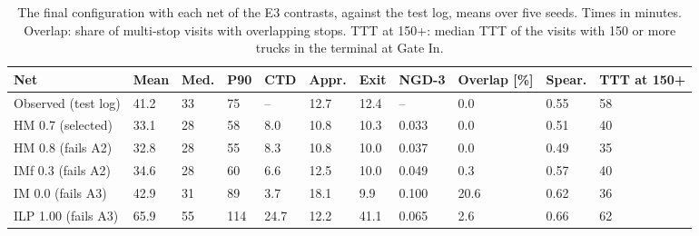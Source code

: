 \begin{table}[htbp]
\centering
\footnotesize
\setlength{\tabcolsep}{3pt}
\begin{tabularx}{\textwidth}{L{3.0cm}YYYYYYYYYY}
\toprule
\textbf{Net} & \textbf{Mean} & \textbf{Med.} & \textbf{P90} & \textbf{CTD} & \textbf{Appr.} & \textbf{Exit} & \textbf{NGD-3} & \textbf{Overlap [\%]} & \textbf{Spear.} & \textbf{TTT at 150+} \\
\midrule
Observed (test log) & 41.2 & 33 & 75 & -- & 12.7 & 12.4 & -- & 0.0 & 0.55 & 58 \\
\midrule
HM 0.7 (selected) & 33.1 & 28 & 58 & 8.0 & 10.8 & 10.3 & 0.033 & 0.0 & 0.51 & 40 \\
HM 0.8 (fails A2) & 32.8 & 28 & 55 & 8.3 & 10.8 & 10.0 & 0.037 & 0.0 & 0.49 & 35 \\
IMf 0.3 (fails A2) & 34.6 & 28 & 60 & 6.6 & 12.5 & 10.0 & 0.049 & 0.3 & 0.57 & 40 \\
IM 0.0 (fails A3) & 42.9 & 31 & 89 & 3.7 & 18.1 & 9.9 & 0.100 & 20.6 & 0.62 & 36 \\
ILP 1.00 (fails A3) & 65.9 & 55 & 114 & 24.7 & 12.2 & 41.1 & 0.065 & 2.6 & 0.66 & 62 \\
\bottomrule
\end{tabularx}
\caption{The final configuration with each net of the E3 contrasts, against the test log, means over five seeds. Times in minutes. Overlap: share of multi-stop visits with overlapping stops. TTT at 150+: median TTT of the visits with 150 or more trucks in the terminal at Gate In.}
\label{tab:rq2_nets}
\end{table}
